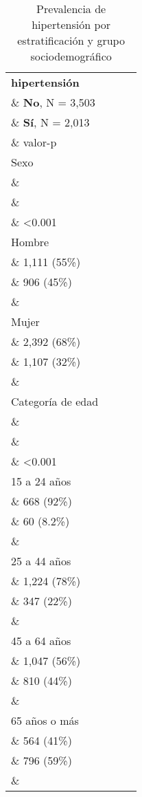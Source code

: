 \documentclass{aa}
\begin{document}
\begin{table}[]
\caption{\small Prevalencia de hipertensión por estratificación y grupo sociodemográfico}
    \centering
    \small
    
    \begin{tabular}{lccc}
\toprule
\textbf{hipertensión} \\\& \textbf{No}, N = 3,503 \\\& \textbf{Sí}, N = 2,013 \\\& valor-p \\ 
\midrule
Sexo \\\&  \\\&  \\\& <0.001 \\ 
\-\hspace{5mm} \tiny Hombre \\\& 1,111 (55\%) \\\& 906 (45\%) \\\&  \\ 
\-\hspace{5mm} \tiny Mujer \\\& 2,392 (68\%) \\\& 1,107 (32\%) \\\&  \\ 
Categoría de edad \\\&  \\\&  \\\& <0.001 \\ 
\-\hspace{5mm} \tiny 15 a 24 años \\\& 668 (92\%) \\\& 60 (8.2\%) \\\&  \\ 
\-\hspace{5mm} \tiny 25 a 44 años \\\& 1,224 (78\%) \\\& 347 (22\%) \\\&  \\ 
\-\hspace{5mm} \tiny 45 a 64 años \\\& 1,047 (56\%) \\\& 810 (44\%) \\\&  \\ 
\-\hspace{5mm} \tiny 65 años o más \\\& 564 (41\%) \\\& 796 (59\%) \\\&  \\ 

\end{tabular}
\end{table}
\end{document}
